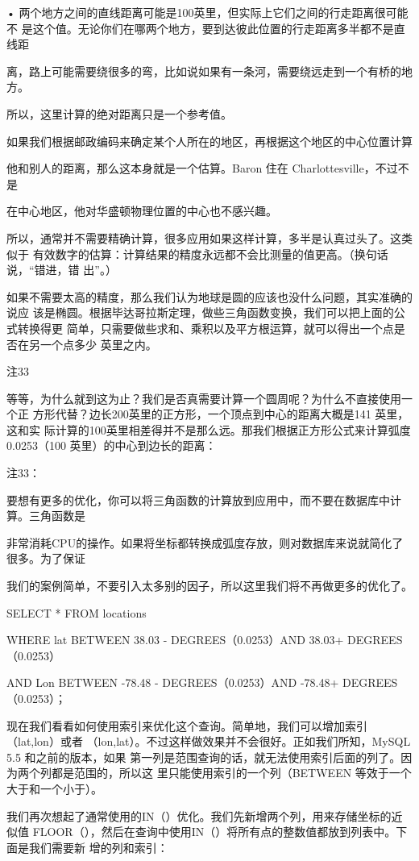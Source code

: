 • 两个地方之间的直线距离可能是100英里，但实际上它们之间的行走距离很可能不
是这个值。无论你们在哪两个地方，要到达彼此位置的行走距离多半都不是直线距

离，路上可能需要绕很多的弯，比如说如果有一条河，需要绕远走到一个有桥的地方。

所以，这里计算的绝对距离只是一个参考值。

如果我们根据邮政编码来确定某个人所在的地区，再根据这个地区的中心位置计算

他和别人的距离，那么这本身就是一个估算。Baron 住在 Charlottesville，不过不是

在中心地区，他对华盛顿物理位置的中心也不感兴趣。

所以，通常并不需要精确计算，很多应用如果这样计算，多半是认真过头了。这类似于
有效数字的估算：计算结果的精度永远都不会比测量的值更高。（换句话说，“错进，错
出”。）

如果不需要太高的精度，那么我们认为地球是圆的应该也没什么问题，其实准确的说应
该是椭圆。根据毕达哥拉斯定理，做些三角函数变换，我们可以把上面的公式转换得更
简单，只需要做些求和、乘积以及平方根运算，就可以得出一个点是否在另一个点多少
英里之内。

注33

等等，为什么就到这为止？我们是否真需要计算一个圆周呢？为什么不直接使用一个正
方形代替？边长200英里的正方形，一个顶点到中心的距离大概是141 英里，这和实
际计算的100英里相差得并不是那么远。那我们根据正方形公式来计算弧度 0.0253（100
英里）的中心到边长的距离：

注33：

要想有更多的优化，你可以将三角函数的计算放到应用中，而不要在数据库中计算。三角函数是

非常消耗CPU的操作。如果将坐标都转换成弧度存放，则对数据库来说就简化了很多。为了保证

我们的案例简单，不要引入太多别的因子，所以这里我们将不再做更多的优化了。

SELECT * FROM locations

WHERE lat BETWEEN 38.03 - DEGREES（0.0253）AND 38.03+ DEGREES（0.0253）

AND Lon BETWEEN -78.48 - DEGREES（0.0253）AND -78.48+ DEGREES（0.0253）；

现在我们看看如何使用索引来优化这个查询。简单地，我们可以增加索引（lat,lon）或者
（lon,lat）。不过这样做效果并不会很好。正如我们所知，MySQL 5.5 和之前的版本，如果
第一列是范围查询的话，就无法使用索引后面的列了。因为两个列都是范围的，所以这
里只能使用索引的一个列（BETWEEN 等效于一个大于和一个小于）。

我们再次想起了通常使用的IN（）优化。我们先新增两个列，用来存储坐标的近似值
FLOOR（），然后在查询中使用IN（）将所有点的整数值都放到列表中。下面是我们需要新
增的列和索引：

